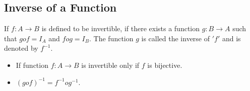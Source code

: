 \documentclass[11pt]{article}
\begin{document}
\begin{multicols}{2}
{\subsection*{Inverse of a  Function}
If $f : A \rightarrow B$ is defined to be invertible, if there exists a function $g : B \rightarrow A$ such that $gof = I_A$ and
$fog = I_B$. The function $g$ is called the inverse of $'f'$ and is denoted by $f^{-1}$.

\begin{itemize}
    \item If function $f : A \rightarrow B$ is invertible only if $f$ is bijective.
    \item $(gof)^{-1} = f^{-1}og^{-1}$.
\end{itemize}

}
\end{multicols}
\end{document}
